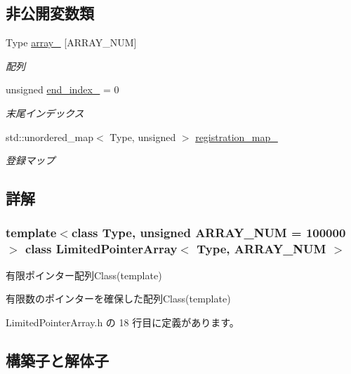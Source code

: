 \subsection*{非公開変数類}
\begin{DoxyCompactItemize}
\item 
Type \mbox{\hyperlink{class_limited_pointer_array_a80e958d7818fc6ee0e757b56abc937a4}{array\+\_\+}} \mbox{[}A\+R\+R\+A\+Y\+\_\+\+N\+UM\mbox{]}
\begin{DoxyCompactList}\small\item\em 配列 \end{DoxyCompactList}\item 
unsigned \mbox{\hyperlink{class_limited_pointer_array_a43624d44d694257ed3f1a49b74b543a3}{end\+\_\+index\+\_\+}} = 0
\begin{DoxyCompactList}\small\item\em 末尾インデックス \end{DoxyCompactList}\item 
std\+::unordered\+\_\+map$<$ Type, unsigned $>$ \mbox{\hyperlink{class_limited_pointer_array_a4f3ca120f5fc23ee3db798cb701d61a0}{registration\+\_\+map\+\_\+}}
\begin{DoxyCompactList}\small\item\em 登録マップ \end{DoxyCompactList}\end{DoxyCompactItemize}


\subsection{詳解}
\subsubsection*{template$<$class Type, unsigned A\+R\+R\+A\+Y\+\_\+\+N\+UM = 100000$>$\newline
class Limited\+Pointer\+Array$<$ Type, A\+R\+R\+A\+Y\+\_\+\+N\+U\+M $>$}

有限ポインター配列\+Class(template) 

有限数のポインターを確保した配列\+Class(template) 

 Limited\+Pointer\+Array.\+h の 18 行目に定義があります。



\subsection{構築子と解体子}
\mbox{\label{class_limited_pointer_array_acab3e47d77fcd7ed7735a735e1aaf8f9}} 
